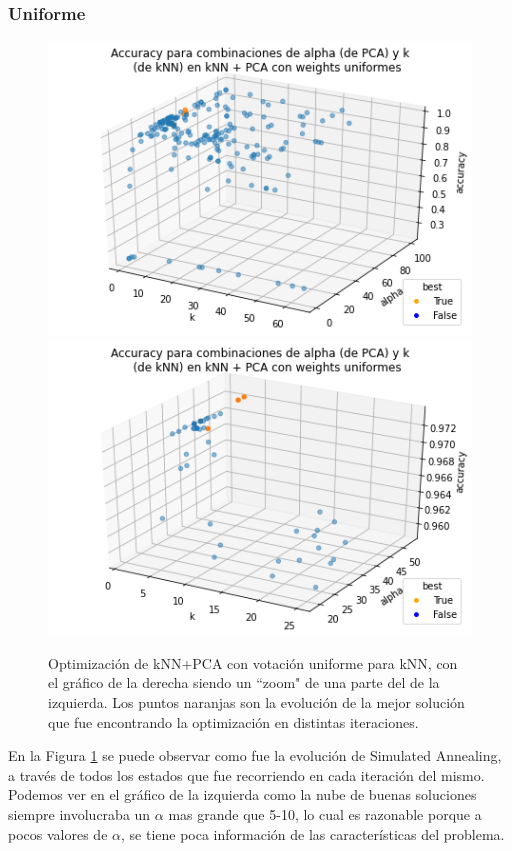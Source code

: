 \documentclass[a4paper]{article}
\begin{document}
      \subsubsection{Uniforme}
    \begin{figure}[H]
            \centering
            \includegraphics[scale=0.5]{img/exp/pca/opt_knn_pca_unif.png}
            \includegraphics[scale=0.5]{img/exp/pca/opt_knn_pca_unif_zoomed.png}
            \caption{Optimización de kNN+PCA con votación uniforme para kNN, con el gráfico de la derecha siendo un ``zoom" de una parte del de la izquierda. Los puntos naranjas son la evolución de la mejor solución que fue encontrando la optimización en distintas iteraciones.}
            \label{fig:knn-pca-unif}
    \end{figure}
      En la Figura \ref{fig:knn-pca-unif} se puede observar como fue la evolución de Simulated Annealing, a través de todos los estados que fue recorriendo en cada iteración del mismo. Podemos ver en el gráfico de la izquierda como la nube de buenas soluciones siempre involucraba un $\alpha$ mas grande que 5-10, lo cual es razonable porque a pocos valores de $\alpha$, se tiene poca información de las características del problema. 
      
\end{document}
